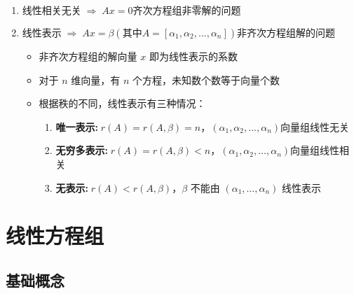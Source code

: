 \documentclass[a4paper,12pt]{article}
\begin{document}
    \begin{enumerate}
        \item $\text{线性相关无关} \;\Rightarrow\; Ax = 0\text{齐次方程组非零解的问题}$
        \item $\text{线性表示} \;\Rightarrow\; Ax = \beta(\text{其中}A = [\alpha_1, \alpha_2, \dots, \alpha_n])\text{非齐次方程组解的问题}$
        \begin{itemize}
            \item 非齐次方程组的解向量 $x$ 即为线性表示的系数
            \item 对于 $n$ 维向量，有 $n$ 个方程，未知数个数等于向量个数
            \item 根据秩的不同，线性表示有三种情况：
            \begin{enumerate}
                \item \textbf{唯一表示:}$\; r(A) = r(A,\beta) = n$，$(\alpha_1, \alpha_2, \dots, \alpha_n)$向量组线性无关
                \item \textbf{无穷多表示:}$\; r(A) = r(A,\beta) < n$，$(\alpha_1, \alpha_2, \dots, \alpha_n)$向量组线性相关
                \item \textbf{无表示:}$\; r(A) < r(A,\beta)$，$\beta$ 不能由 $(\alpha_1,\dots,\alpha_n)$ 线性表示
            \end{enumerate}
        \end{itemize}
    \end{enumerate}

    \section{线性方程组}

    \subsection{基础概念}
\end{document}
